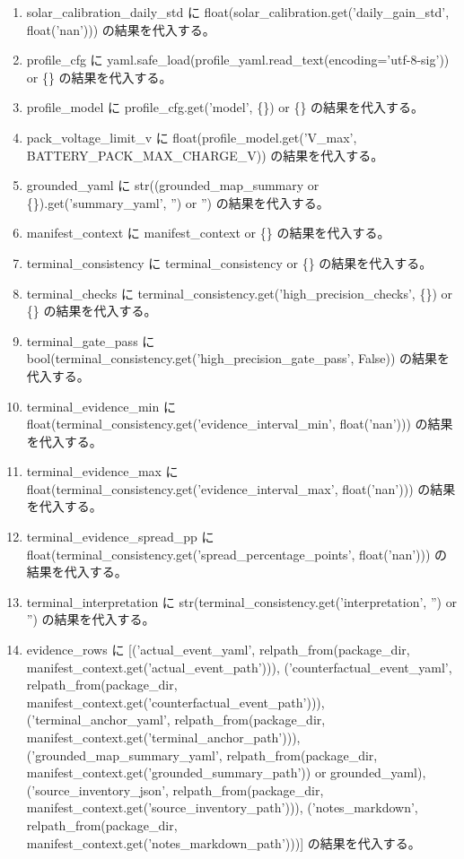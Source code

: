 \documentclass[a4paper,11pt]{article}
\begin{document}
\begin{enumerate}[leftmargin=1.8em]
\item solar\_calibration\_daily\_std に float(solar\_calibration.get('daily\_gain\_std', float('nan'))) の結果を代入する。
\item profile\_cfg に yaml.safe\_load(profile\_yaml.read\_text(encoding='utf-8-sig')) or \{\} の結果を代入する。
\item profile\_model に profile\_cfg.get('model', \{\}) or \{\} の結果を代入する。
\item pack\_voltage\_limit\_v に float(profile\_model.get('V\_max', BATTERY\_PACK\_MAX\_CHARGE\_V)) の結果を代入する。
\item grounded\_yaml に str((grounded\_map\_summary or \{\}).get('summary\_yaml', '') or '') の結果を代入する。
\item manifest\_context に manifest\_context or \{\} の結果を代入する。
\item terminal\_consistency に terminal\_consistency or \{\} の結果を代入する。
\item terminal\_checks に terminal\_consistency.get('high\_precision\_checks', \{\}) or \{\} の結果を代入する。
\item terminal\_gate\_pass に bool(terminal\_consistency.get('high\_precision\_gate\_pass', False)) の結果を代入する。
\item terminal\_evidence\_min に float(terminal\_consistency.get('evidence\_interval\_min', float('nan'))) の結果を代入する。
\item terminal\_evidence\_max に float(terminal\_consistency.get('evidence\_interval\_max', float('nan'))) の結果を代入する。
\item terminal\_evidence\_spread\_pp に float(terminal\_consistency.get('spread\_percentage\_points', float('nan'))) の結果を代入する。
\item terminal\_interpretation に str(terminal\_consistency.get('interpretation', '') or '') の結果を代入する。
\item evidence\_rows に [('actual\_event\_yaml', relpath\_from(package\_dir, manifest\_context.get('actual\_event\_path'))), ('counterfactual\_event\_yaml', relpath\_from(package\_dir, manifest\_context.get('counterfactual\_event\_path'))), ('terminal\_anchor\_yaml', relpath\_from(package\_dir, manifest\_context.get('terminal\_anchor\_path'))), ('grounded\_map\_summary\_yaml', relpath\_from(package\_dir, manifest\_context.get('grounded\_summary\_path')) or grounded\_yaml), ('source\_inventory\_json', relpath\_from(package\_dir, manifest\_context.get('source\_inventory\_path'))), ('notes\_markdown', relpath\_from(package\_dir, manifest\_context.get('notes\_markdown\_path')))] の結果を代入する。

\end{enumerate}
\end{document}
